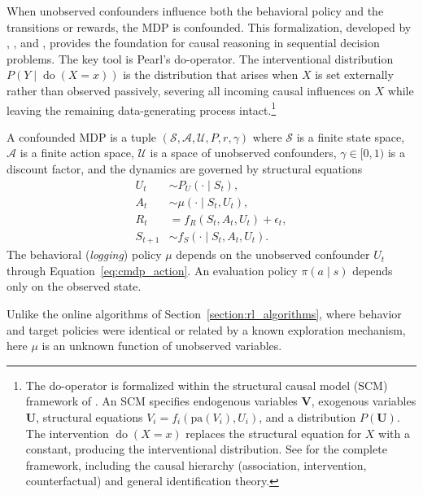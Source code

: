 When unobserved confounders influence both the behavioral policy and the transitions or rewards, the MDP is confounded. This formalization, developed by \citet{zhang2019near}, \citet{zhang2020causal}, and \citet{kallus2020confounding}, provides the foundation for causal reasoning in sequential decision problems. The key tool is Pearl's do-operator. The interventional distribution $P(Y \mid \operatorname{do}(X = x))$ is the distribution that arises when $X$ is set externally rather than observed passively, severing all incoming causal influences on $X$ while leaving the remaining data-generating process intact.\footnote{The do-operator is formalized within the structural causal model (SCM) framework of \citet{pearl2009causality}. An SCM specifies endogenous variables $\mathbf{V}$, exogenous variables $\mathbf{U}$, structural equations $V_i = f_i(\text{pa}(V_i), U_i)$, and a distribution $P(\mathbf{U})$. The intervention $\operatorname{do}(X = x)$ replaces the structural equation for $X$ with a constant, producing the interventional distribution. See \citet{pearl2009causality} for the complete framework, including the causal hierarchy (association, intervention, counterfactual) and general identification theory.}

\begin{definition}
\label{def:confounded_mdp}
A confounded MDP is a tuple $(\mathcal{S}, \mathcal{A}, \mathcal{U}, P, r, \gamma)$ where $\mathcal{S}$ is a finite state space, $\mathcal{A}$ is a finite action space, $\mathcal{U}$ is a space of unobserved confounders, $\gamma \in [0,1)$ is a discount factor, and the dynamics are governed by structural equations
\begin{align}
U_t &\sim P_U(\cdot \mid S_t), \label{eq:cmdp_confounder} \\
A_t &\sim \mu(\cdot \mid S_t, U_t), \label{eq:cmdp_action} \\
R_t &= f_R(S_t, A_t, U_t) + \epsilon_t, \label{eq:cmdp_reward} \\
S_{t+1} &\sim f_S(\cdot \mid S_t, A_t, U_t). \label{eq:cmdp_transition}
\end{align}
The behavioral (\textit{logging}) policy $\mu$ depends on the unobserved confounder $U_t$ through Equation~\eqref{eq:cmdp_action}. An evaluation policy $\pi(a \mid s)$ depends only on the observed state.
\end{definition}

Unlike the online algorithms of Section~\ref{section:rl_algorithms}, where behavior and target policies were identical or related by a known exploration mechanism, here $\mu$ is an unknown function of unobserved variables.


